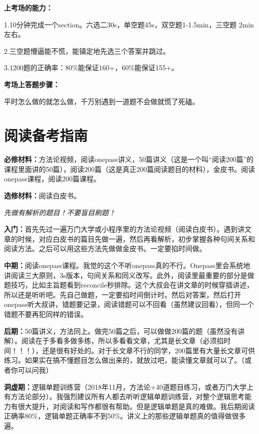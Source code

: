\documentclass[cn,plain]{./src/qyxfbook}
\newenvironment{material}{\begin{tcolorbox}[title={材料}]}{\end{tcolorbox}}
\newcommand{\red}[1]{\textcolor[rgb]{1,0,0}{#1}}
\begin{document}
			
			\textbf{上考场的能力：}\par
			1.10分钟完成一个section。六选二30s，单空题45s，双空题1-1.5min，三空题	2min左右。\par
			2.三空题懵逼能不慌，能镇定地先选三个答案并跳过。\par
			3.1200题的正确率：80\%能保证160+，60\%能保证155+。

			
			\textbf{考场上答题步骤：}\par
			平时怎么做的就怎么做，千万别遇到一道题不会做就慌了死磕。
			
		

		\section{阅读备考指南}
			\begin{material}
			\textbf{必修材料：}方法论视频，阅读onepass讲义，50篇讲义（这是一个叫“阅读200篇”的课程里面讲的50篇），阅读200篇（这是真正200篇阅读题目的材料），金皮书。阅读onepass课程，阅读200篇课程。\par
			\textbf{选修材料：}阅读白皮书。
		\end{material}
			\red{\itshape \Large 先做有解析的题目！不要盲目刷题！}

			
			\textbf{入门：}首先先过一遍万门大学或小程序里的方法论视频（阅读白皮书）。遇到讲文章的时候，对应白皮书的篇目先做一遍，然后再看解析，初步掌握各种句间关系和阅读方法。之后可以用这些方法先做做金皮书。一定要掐时间做。

			
			\textbf{中期：}阅读onepass课程。我觉的这个不听onepass真的不行。Onepass里会系统地讲阅读三大原则，3s版本，句间关系和同义改写。此外，阅读里最重要的部分是做题技巧，比如主旨题看到reconcile秒排除。这个大叔会在讲文章的时候穿插讲述，所以还是听听吧。先自己做题，一定要掐时间倒计时。然后对答案，然后打开onepass听大叔讲，错题要记录，阅读错题可以不回看（虽然建议回看），但同一个错题不要再犯同样的错误。

			
			\textbf{后期：}50篇讲义，方法同上。做完50篇之后，可以做做200篇的题（虽然没有讲解）。阅读在于多看多做多练，所以多看看文章，尤其是长文章（必须掐时间！！！），还是很有好处的。对于长文章不行的同学，200篇里有大量长文章可供练习。如果实在搞不懂题目怎么做出来的，就放过吧，能读懂文章就可以了。（或者你可以问我）

			
			\textbf{洞虚期：}逻辑单题训练营（2018年11月，方法论+40道题目练习，或者万门大学上有方法论部分）。我强烈建议所有人都去听听逻辑单题训练营，对整个逻辑思考能力有很大提升，对阅读和写作都很有帮助。但是逻辑单题是真的难做。我后期阅读正确率80\%，逻辑单题正确率不到50\%。讲义上的那些逻辑单题真的值得做很多遍。
\end{document}
